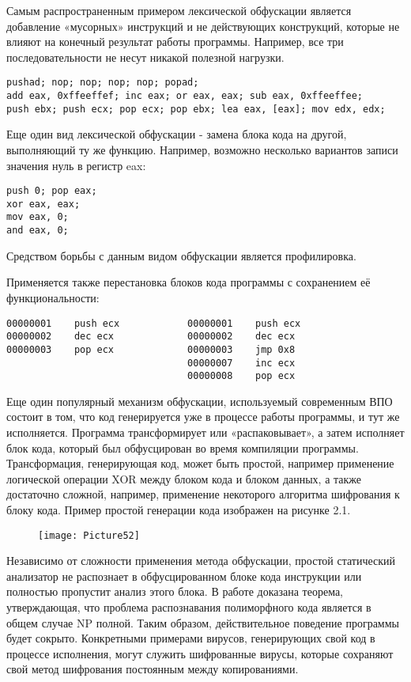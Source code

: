 \documentclass[oneside, final, 14pt]{extreport}
\begin{document}
Самым распространенным примером лексической обфускации является добавление «мусорных» инструкций и не действующих конструкций, которые не влияют на конечный результат работы программы. Например, все три последовательности не несут никакой полезной нагрузки.
\begin{verbatim}
pushad; nop; nop; nop; nop; popad; 
add eax, 0xffeeffef; inc eax; or eax, eax; sub eax, 0xffeeffee;
push ebx; push ecx; pop ecx; pop ebx; lea eax, [eax]; mov edx, edx;
\end{verbatim}
Еще один вид лексической обфускации - замена блока кода на другой, выполняющий ту же функцию. Например, возможно несколько вариантов записи значения нуль в регистр eax:
\begin{verbatim}
push 0; pop eax;
xor eax, eax;
mov eax, 0;
and eax, 0;
\end{verbatim} 

Средством борьбы с данным видом обфускации является профилировка.

Применяется также перестановка блоков кода программы с сохранением её функциональности:

\begin{verbatim}
00000001    push ecx            00000001    push ecx		 	
00000002    dec ecx             00000002    dec ecx		
00000003    pop ecx             00000003    jmp 0x8		
                                00000007    inc ecx 
                                00000008    pop ecx 
\end{verbatim}

Еще один популярный механизм обфускации, используемый современным ВПО  состоит в том, что код генерируется уже в процессе работы программы, и тут же исполняется. Программа трансформирует или «распаковывает», а затем исполняет блок кода, который был обфусцирован во время компиляции программы. Трансформация, генерирующая код, может быть простой, например применение логической операции XOR между блоком кода и блоком данных, а также достаточно сложной, например, применение некоторого алгоритма шифрования к блоку кода. Пример простой генерации кода изображен на рисунке 2.1. 

\begin{figure}[t]
	\centering
	\texttt{[image: Picture52]}
	\caption{}
	\label{truck_figure}
\end{figure}

Независимо от сложности применения метода обфускации, простой статический анализатор не распознает в обфусцированном блоке кода инструкции или полностью пропустит анализ этого блока. В работе \cite{Metam} доказана теорема, утверждающая, что проблема распознавания полиморфного кода является в общем случае NP полной. Таким образом, действительное поведение программы будет сокрыто. Конкретными примерами вирусов, генерирующих свой код в процессе исполнения, могут служить шифрованные вирусы, которые сохраняют свой метод шифрования постоянным между копированиями. 
\end{document}
